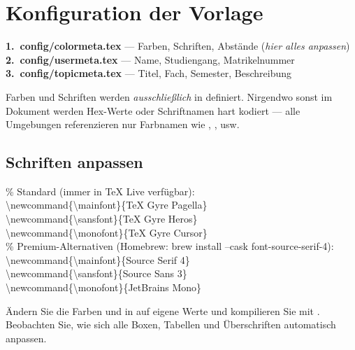 \section{Konfiguration der Vorlage}

\begin{infobox}
  \textbf{1.\ config/colormeta.tex} — Farben, Schriften, Abstände (\emph{hier alles anpassen})\\
  \textbf{2.\ config/usermeta.tex} — Name, Studiengang, Matrikelnummer\\
  \textbf{3.\ config/topicmeta.tex} — Titel, Fach, Semester, Beschreibung
\end{infobox}

\begin{merksatz}
  Farben und Schriften werden \emph{ausschließlich} in 
  definiert. Nirgendwo sonst im Dokument werden Hex-Werte oder Schriftnamen
  hart kodiert — alle Umgebungen referenzieren nur Farbnamen wie
  , ,  usw.
\end{merksatz}

\subsection{Schriften anpassen}

\begin{codebox}
\% Standard (immer in TeX Live verfügbar):\\
\textbackslash newcommand\{\textbackslash mainfont\}\{TeX Gyre Pagella\}\\
\textbackslash newcommand\{\textbackslash sansfont\}\{TeX Gyre Heros\}\\
\textbackslash newcommand\{\textbackslash monofont\}\{TeX Gyre Cursor\}\\[4pt]
\% Premium-Alternativen (Homebrew: brew install --cask font-source-serif-4):\\
\textbackslash newcommand\{\textbackslash mainfont\}\{Source Serif 4\}\\
\textbackslash newcommand\{\textbackslash sansfont\}\{Source Sans 3\}\\
\textbackslash newcommand\{\textbackslash monofont\}\{JetBrains Mono\}
\end{codebox}

\begin{aufgabe}
  Ändern Sie die Farben  und  in
   auf eigene Werte und kompilieren Sie mit
  . Beobachten Sie, wie sich alle Boxen, Tabellen
  und Überschriften automatisch anpassen.
\end{aufgabe}
